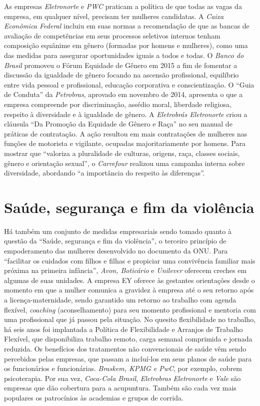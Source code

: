 As empresas \emph{Eletronorte} e \emph{PWC} praticam a política de que
todas as vagas da empresa, em qualquer nível, precisam ter mulheres
candidatas. A \emph{Caixa Econômica Federal} incluiu em suas normas a
recomendação de que as bancas de avaliação de competências em seus
processos seletivos internos tenham composição equânime em gênero
(formadas por homens e mulheres), como uma das medidas para assegurar
oportunidades iguais a todos e todas. O \emph{Banco do Brasil} promoveu
o Fórum Equidade de Gênero em 2015 a fim de fomentar a discussão da
igualdade de gênero focando na ascensão profissional, equilíbrio entre
vida pessoal e profissional, educação corporativa e conscientização. O
``Guia de Conduta'' da \emph{Petrobras}, aprovado em novembro de 2014,
apresenta o que a empresa compreende por discriminação, assédio moral,
liberdade religiosa, respeito à diversidade e à igualdade de gênero. A
\emph{Eletrobrás Eletronorte} criou a cláusula ``Da Promoção da Equidade
de Gênero e Raça'' no seu manual de práticas de contratação. A ação
resultou em mais contratações de mulheres nas funções de motorista e
vigilante, ocupadas majoritariamente por homens. Para mostrar que
``valoriza a pluralidade de culturas, origens, raça, classes sociais,
gênero e orientação sexual'', o \emph{Carrefour} realizou uma campanha
interna sobre diversidade, abordando ``a importância do respeito às
diferenças''.

\section{Saúde, segurança e fim da violência}

Há também um conjunto de medidas empresariais sendo tomado quanto à
questão da ``Saúde, segurança e fim da violência'', o terceiro princípio
de empoderamento das mulheres desenvolvido no documento da ONU. Para
``facilitar os cuidados com filhos e filhas e propiciar uma convivência
familiar mais próxima na primeira infância'', \emph{Avon, Boticário} e
\emph{Unilever} oferecem creches em algumas de suas unidades. A empresa
EY oferece às gestantes orientações desde o momento em que a mulher
comunica a gravidez à empresa até o seu retorno após a
licença-maternidade, sendo garantido um retorno ao trabalho com agenda
flexível, \emph{coaching} (aconselhamento) para seu momento profissional
e mentoria com uma profissional que já passou pela situação. No quesito
flexibilidade no trabalho, há seis anos foi implantada a Política de
Flexibilidade e Arranjos de Trabalho Flexível, que disponibiliza
trabalho remoto, carga semanal comprimida e jornada reduzida. Os
benefícios dos tratamentos não convencionais de saúde vêm sendo
percebidos pelas empresas, que passam a incluí-los em seus planos de
saúde para os funcionários e funcionárias. \emph{Braskem, KPMG e PwC},
por exemplo, cobrem psicoterapia. Por sua vez, \emph{Coca-Cola Brasil},
\emph{Eletrobras} \emph{Eletronorte} e \emph{Vale} são empresas que dão
cobertura para a acupuntura. Também são cada vez mais populares os
patrocínios às academias e grupos de corrida.

